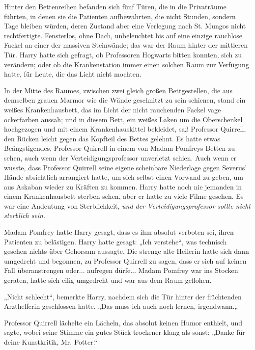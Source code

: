 {Hinter den Bettenreihen befanden sich fünf Türen, die in die Privaträume führten, in denen sie die Patienten aufbewahrten, die nicht Stunden, sondern Tage bleiben würden, deren Zustand aber eine Verlegung nach St. Mungos nicht rechtfertigte. Fensterlos, ohne Dach, unbeleuchtet bis auf eine einzige rauchlose Fackel an einer der massiven Steinwände; das war der Raum hinter der mittleren Tür. Harry hatte sich gefragt, ob Professoren Hogwarts bitten konnten, sich zu verändern; oder ob die Krankenstation immer einen solchen Raum zur Verfügung hatte, für Leute, die das Licht nicht mochten.

In der Mitte des Raumes, zwischen zwei gleich großen Bettgestellen, die aus demselben grauen Marmor wie die Wände geschnitzt zu sein schienen, stand ein weißes Krankenhausbett, das im Licht der nicht rauchenden Fackel vage ockerfarben aussah; und in diesem Bett, ein weißes Laken um die Oberschenkel hochgezogen und mit einem Krankenhauskittel bekleidet, saß Professor Quirrell, den Rücken leicht gegen das Kopfteil des Bettes gelehnt. Es hatte etwas Beängstigendes, Professor Quirrell in einem von Madam Pomfreys Betten zu sehen, auch wenn der Verteidigungsprofessor unverletzt schien. Auch wenn er wusste, dass Professor Quirrell seine eigene scheinbare Niederlage gegen Severus' Hände absichtlich arrangiert hatte, um sich selbst einen Vorwand zu geben, um aus Askaban wieder zu Kräften zu kommen. Harry hatte noch nie jemanden in einem Krankenhausbett sterben sehen, aber er hatte zu viele Filme gesehen. Es war eine Andeutung von Sterblichkeit, \emph{und der Verteidigungsprofessor sollte nicht sterblich sein}.

Madam Pomfrey hatte Harry gesagt, dass es ihm absolut verboten sei, ihren Patienten zu belästigen. Harry hatte gesagt: „Ich verstehe“, was technisch gesehen nichts über Gehorsam aussagte. Die strenge alte Heilerin hatte sich dann umgedreht und begonnen, zu Professor Quirrell zu sagen, dass er sich auf keinen Fall überanstrengen oder... aufregen dürfe... Madam Pomfrey war ins Stocken geraten, hatte sich eilig umgedreht und war aus dem Raum geflohen.

„Nicht schlecht“, bemerkte Harry, nachdem sich die Tür hinter der flüchtenden Arzthelferin geschlossen hatte. „Das muss ich auch noch lernen, irgendwann.„

Professor Quirrell lächelte ein Lächeln, das absolut keinen Humor enthielt, und sagte, wobei seine Stimme ein gutes Stück trockener klang als sonst: „Danke für deine Kunstkritik, Mr. Potter.“

}
